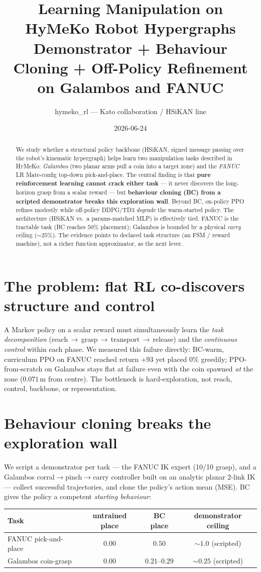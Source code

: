 \documentclass[11pt]{article}
\title{\textbf{Learning Manipulation on HyMeKo Robot Hypergraphs}\\
       \large Demonstrator + Behaviour Cloning + Off-Policy Refinement on Galambos and FANUC}
\author{hymeko\_rl --- Kato collaboration / HSiKAN line}
\date{2026-06-24}
\begin{document}
\maketitle

\begin{abstract}
\noindent We study whether a structural policy backbone (HSiKAN, signed message passing over the robot's
kinematic hypergraph) helps learn two manipulation tasks described in HyMeKo: \emph{Galambos} (two planar arms
pull a coin into a target zone) and the \emph{FANUC} LR Mate-config top-down pick-and-place. The central finding
is that \textbf{pure reinforcement learning cannot crack either task} --- it never discovers the long-horizon
grasp from a scalar reward --- but \textbf{behaviour cloning (BC) from a scripted demonstrator breaks this
exploration wall}. Beyond BC, on-policy PPO refines modestly while off-policy DDPG/TD3 \emph{degrade} the
warm-started policy. The architecture (HSiKAN vs.\ a params-matched MLP) is effectively tied. FANUC is the
tractable task (BC reaches $50\%$ placement); Galambos is bounded by a physical \emph{carry} ceiling
($\sim 25\%$). The evidence points to declared task structure (an FSM / reward machine), not a richer function
approximator, as the next lever.
\end{abstract}

\section{The problem: flat RL co-discovers structure and control}
A Markov policy on a scalar reward must simultaneously learn the \emph{task decomposition}
(reach\,$\to$\,grasp\,$\to$\,transport\,$\to$\,release) and the \emph{continuous control} within each phase. We
measured this failure directly: BC-warm, curriculum PPO on FANUC reached return $+93$ yet placed $0\%$ greedily;
PPO-from-scratch on Galambos stays flat at failure even with the coin spawned \emph{at} the zone
($0.071$\,m from centre). The bottleneck is hard-exploration, not reach, control, backbone, or representation.

\section{Behaviour cloning breaks the exploration wall}
We script a demonstrator per task --- the FANUC IK expert (10/10 grasp), and a Galambos corral$\to$pinch$\to$carry
controller built on an analytic planar 2-link IK --- collect successful trajectories, and clone the policy's
action mean (MSE). BC gives the policy a competent \emph{starting behaviour}:
\begin{center}\small
\begin{tabular}{lccc}
\toprule
Task & untrained place & \textbf{BC place} & demonstrator ceiling \\
\midrule
FANUC pick-and-place & $0.00$ & $\mathbf{0.50}$ & $\sim 1.0$ (scripted) \\
Galambos coin-grasp  & $0.00$ & $\mathbf{0.21\text{--}0.29}$ & $\sim 0.25$ (scripted) \\
\bottomrule
\end{tabular}
\end{center}
\end{document}
